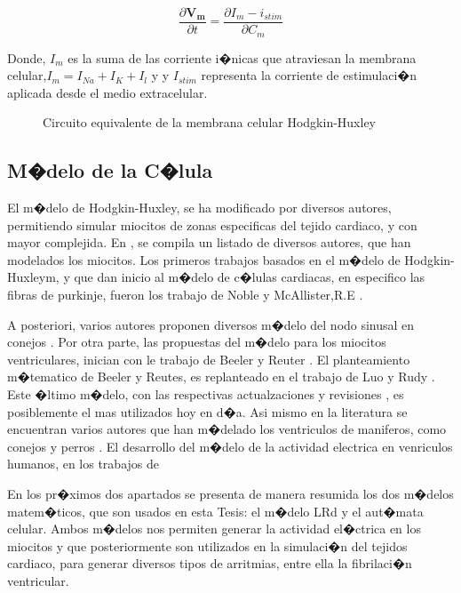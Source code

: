 \begin{equation}\label{eq:N-N}
\frac{\partial{\mathbf{V_m}}}{\partial{t}}=
\frac{\partial{I_{m} - i_{stim}}}{\partial{C_m}}
\end{equation}

Donde, $I_m$ es la suma de las corriente i�nicas que  atraviesan la
membrana celular,$I_m = I_{Na} + I_K + I_l$ y y $I_{stim}$ representa la
corriente de estimulaci�n aplicada desde el medio extracelular.


\begin{figure}[t]
\centering
\caption{Circuito equivalente de la membrana celular Hodgkin-Huxley }
  \label{fig:circuitomembrana}
\end{figure}
 


\subsection{M�delo de la C�lula}

El m�delo de Hodgkin-Huxley, se ha modificado por diversos
autores, permitiendo simular miocitos de zonas especificas del tejido cardiaco,
y con mayor complejida. En \cite{Sachse04}, se compila un listado de diversos
autores, que han modelados los miocitos. Los primeros trabajos basados en
el m�delo de Hodgkin-Huxleym, y que dan inicio al m�delo de c�lulas
cardiacas, en especifico las fibras de purkinje, fueron los trabajo de Noble
\cite{noble1962} y McAllister,R.E \cite{mcallister1975}. 

A posteriori, varios autores proponen diversos m�delo del nodo sinusal en
conejos \cite{noble1984, demir1994}. Por otra parte, las propuestas del m�delo
para los miocitos ventriculares, inician con le trabajo de Beeler y Reuter
\cite{beeler1977}. El planteamiento m�tematico de Beeler y Reutes, es
replanteado en el trabajo de Luo y Rudy \cite{luo1991}. Este �ltimo m�delo, con
las respectivas actualzaciones  y revisiones \cite{luo1994, livshitz2007}, es
posiblemente el mas utilizados hoy en d�a.
Asi mismo en la literatura se encuentran varios autores que han m�delado los
ventriculos de maniferos, como conejos y perros \cite{courtemanche1998,
demir1996, lindblad1996, noble1998}.  El desarrollo del m�delo de la actividad
electrica en venriculos humanos, en los  trabajos de
\cite{nygren1998, bernus2002, sachse2003, ten2004}

En los pr�ximos dos apartados se presenta de manera resumida los
dos m�delos matem�ticos, que son usados en esta Tesis: el m�delo \acf{LRd} y el
aut�mata celular. Ambos m�delos nos permiten generar la actividad
el�ctrica en los miocitos y que posteriormente  son utilizados en la  simulaci�n
del tejidos cardiaco, para generar diversos tipos de arritmias, entre ella la
fibrilaci�n ventricular.  




